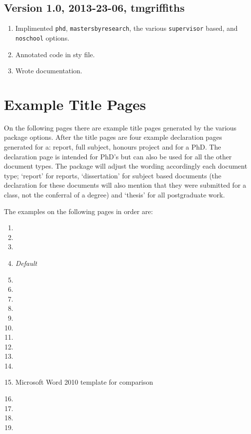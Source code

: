 \documentclass[12pt,oneside]{article}
\newcommand{\oporcom}[1]{\texttt{\color{Red}#1}} %
\begin{document}
\subsection*{Version 1.0, 2013-23-06, tmgriffiths}
\begin{enumerate}
    \item Implimented \oporcom{phd}, \oporcom{mastersbyresearch}, the various \oporcom{supervisor} based, and \oporcom{noschool} options.
    \item Annotated code in sty file.
    \item Wrote documentation.
\end{enumerate}

\clearpage
\section{Example Title Pages}
On the following pages there are example title pages generated by the various package options. After the title pages are four example declaration pages generated for a: report, full subject, honours project and for a PhD. The declaration page is intended for PhD's but can also be used for all the other document types. The package will adjust the wording accordingly each document type; `report' for reports, `dissertation' for subject based documents (the declaration for these documents will also mention that they were submitted for a class, not the conferral of a degree) and `thesis' for all postgraduate work.

The examples on the following pages in order are:
\begin{enumerate}
    \item {}
    \item {}
    \item {}
    \item {} \emph{Default}
    \item {}
    \item {}
    \item {}
    \item {}
    \item {}
    \item {}
    \item {}
    \item {}
    \item {}
    \item {}
    \item Microsoft Word 2010 template for comparison
    \item {} 
    \item {} 
    \item {} 
    \item {} 
\end{enumerate}
\end{document}

